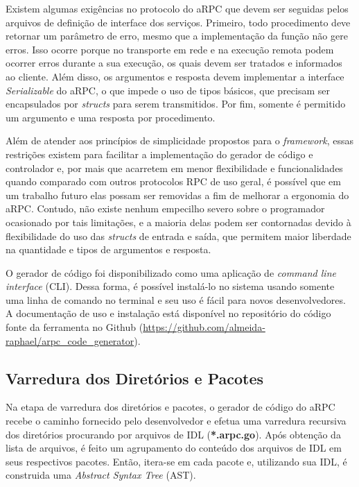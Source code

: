 Existem algumas exigências no protocolo do aRPC que devem ser seguidas pelos arquivos de definição de interface dos serviços. Primeiro, todo procedimento deve retornar um parâmetro de erro, mesmo que a implementação da função não gere erros. Isso ocorre porque no transporte em rede e na execução remota podem ocorrer erros durante a sua execução, os quais devem ser tratados e informados ao cliente. Além disso, os argumentos e resposta devem implementar a interface \textit{Serializable} do aRPC, o que impede o uso de tipos básicos, que precisam ser encapsulados por \textit{structs} para serem transmitidos. Por fim, somente é permitido um argumento e uma resposta por procedimento. 

Além de atender aos princípios de simplicidade propostos para o \textit{framework}, essas restrições existem para facilitar a implementação do gerador de código e controlador e, por mais que acarretem em menor flexibilidade e funcionalidades quando comparado com outros protocolos RPC de uso geral, é possível que em um trabalho futuro elas possam ser removidas a fim de melhorar a ergonomia do aRPC. Contudo, não existe nenhum empecilho severo sobre o programador ocasionado por tais limitações, e a maioria delas podem ser contornadas devido à flexibilidade do uso das \textit{structs} de entrada e saída, que permitem maior liberdade na quantidade e tipos de argumentos e resposta.

O gerador de código foi disponibilizado como uma aplicação de \textit{command line interface} (CLI). Dessa forma, é possível instalá-lo no sistema usando somente uma linha  de comando no terminal e seu uso é fácil para novos desenvolvedores. A documentação de uso e instalação está disponível no repositório do código fonte da ferramenta no Github (\url{https://github.com/almeida-raphael/arpc\_code\_generator}).

\subsection{Varredura dos Diretórios e Pacotes}

Na etapa de varredura dos diretórios e pacotes, o gerador de código do aRPC recebe o caminho fornecido pelo desenvolvedor e efetua uma varredura recursiva dos diretórios procurando por arquivos de IDL (\textbf{*.arpc.go}). Após obtenção da lista de arquivos, é feito um agrupamento do conteúdo dos arquivos de IDL em seus respectivos pacotes. Então, itera-se em cada pacote e, utilizando sua IDL, é construida uma \textit{Abstract Syntax Tree} (AST).

